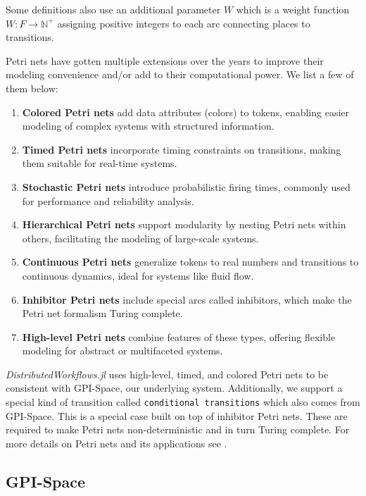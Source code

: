 \documentclass{juliacon}
\begin{document}
Some definitions also use an additional parameter $W$ which is a weight function $W : F \longrightarrow \mathbb{N}^+$ assigning positive integers to each arc connecting places to transitions.\vskip 6pt

Petri nets have gotten multiple extensions over the years to improve their modeling convenience and/or add to their computational power.
We list a few of them below:

\begin{enumerate} 
    \item \textbf{Colored Petri nets} add data attributes (colors) to tokens, enabling easier modeling of complex systems with structured information. 
    \item \textbf{Timed Petri nets} incorporate timing constraints on transitions, making them suitable for real-time systems. 
    \item \textbf{Stochastic Petri nets} introduce probabilistic firing times, commonly used for performance and reliability analysis. 
    \item \textbf{Hierarchical Petri nets} support modularity by nesting Petri nets within others, facilitating the modeling of large-scale systems.
    \item \textbf{Continuous Petri nets} generalize tokens to real numbers and transitions to continuous dynamics, ideal for systems like fluid flow. 
    \item \textbf{Inhibitor Petri nets} include special arcs called inhibitors, which make the Petri net formalism Turing complete.
    \item \textbf{High-level Petri nets} combine features of these types, offering flexible modeling for abstract or multifaceted systems.
\end{enumerate}

\emph{DistributedWorkflows.jl} uses high-level, timed, and colored Petri nets to be consistent with GPI-Space, our underlying system.
Additionally, we support a special kind of transition called \verb+conditional transitions+ which also comes from GPI-Space. This is a special case built on top of inhibitor Petri nets.
These are required to make Petri nets non-deterministic and in turn Turing complete.
For more details on Petri nets and its applications see \cite{Introduction_to_petri_nets_book, Understanding_Petri_nets_book, IEEE_1989paper_petrinets_and_its_applications, petri_nets_paper_IEEE_inhibitor_nets}.\vskip 6pt

\subsection{GPI-Space}
\label{sec:gpispace}
\end{document}
